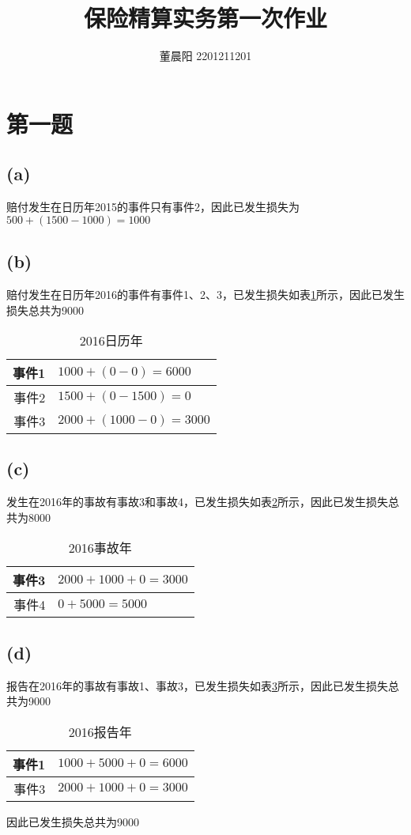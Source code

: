 \documentclass[a4paper,12pt]{ctexart}
\title{保险精算实务第一次作业}
\author{董晨阳 2201211201}
\begin{document}
\maketitle
\section*{第一题}
\subsection*{(a)}
赔付发生在日历年2015的事件只有事件2，因此已发生损失为$500+(1500-1000)=1000$
\subsection*{(b)}
赔付发生在日历年2016的事件有事件1、2、3，已发生损失如表\ref{(b)}所示，因此已发生损失总共为9000
\begin{table}[H]
    \centering
    \begin{tabular}{|r|l|}
        \hline
        事件1 & $1000+(0-0)=6000$    \\\hline
        事件2 & $1500+(0-1500)=0$    \\\hline
        事件3 & $2000+(1000-0)=3000$ \\\hline
    \end{tabular}
    \caption{2016日历年}
    \label{(b)}
\end{table}
\subsection*{(c)}
发生在2016年的事故有事故3和事故4，已发生损失如表\ref{(c)}所示，因此已发生损失总共为8000
\begin{table}[H]
    \centering
    \begin{tabular}{|r|l|}
        \hline
        事件3 & $2000+1000+0=3000$ \\\hline
        事件4 & $0+5000=5000$      \\\hline
    \end{tabular}
    \caption{2016事故年}
    \label{(c)}
\end{table}
\subsection*{(d)}
报告在2016年的事故有事故1、事故3，已发生损失如表\ref{(d)}所示，因此已发生损失总共为9000
\begin{table}[H]
    \centering
    \begin{tabular}{|r|l|}
        \hline
        事件1 & $1000+5000+0=6000$ \\\hline
        事件3 & $2000+1000+0=3000$ \\\hline
    \end{tabular}
    \caption{2016报告年}
    \label{(d)}
\end{table}
因此已发生损失总共为9000
\end{document}

